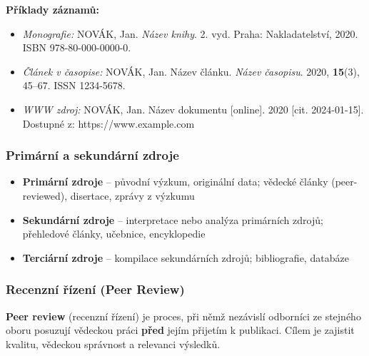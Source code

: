 \textbf{Příklady záznamů:}
\begin{itemize}
  \item \textit{Monografie:} NOVÁK, Jan. \textit{Název knihy}. 2. vyd. Praha: Nakladatelství, 2020. ISBN 978-80-000-0000-0.
  \item \textit{Článek v časopise:} NOVÁK, Jan. Název článku. \textit{Název časopisu}. 2020, \textbf{15}(3), 45--67. ISSN 1234-5678.
  \item \textit{WWW zdroj:} NOVÁK, Jan. Název dokumentu [online]. 2020 [cit. 2024-01-15]. Dostupné z: https://www.example.com
\end{itemize}

\subsubsection{Primární a sekundární zdroje}

\begin{itemize}
  \item \textbf{Primární zdroje} -- původní výzkum, originální data; vědecké články (peer-reviewed), disertace, zprávy z výzkumu
  \item \textbf{Sekundární zdroje} -- interpretace nebo analýza primárních zdrojů; přehledové články, učebnice, encyklopedie
  \item \textbf{Terciární zdroje} -- kompilace sekundárních zdrojů; bibliografie, databáze
\end{itemize}

\subsubsection{Recenzní řízení (Peer Review)}

\textbf{Peer review} (recenzní řízení) je proces, při němž nezávislí odborníci ze stejného oboru posuzují vědeckou práci \textbf{před} jejím přijetím k publikaci. Cílem je zajistit kvalitu, vědeckou správnost a relevanci výsledků.


